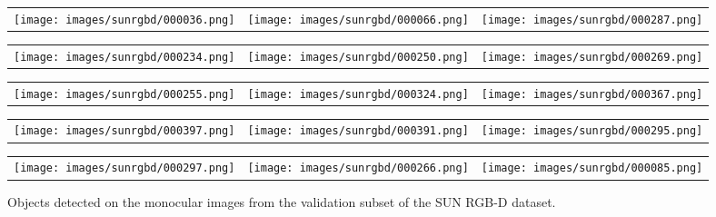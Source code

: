 \documentclass[10pt,twocolumn,letterpaper]{article}
\begin{document}
\begin{figure*}[!ht]
\centering
\setlength{\tabcolsep}{2pt}
\renewcommand{\arraystretch}{0.75}
\begin{tabular}{ccc}
    \texttt{[image: images/sunrgbd/000036.png]} &
    \texttt{[image: images/sunrgbd/000066.png]} &
    \texttt{[image: images/sunrgbd/000287.png]} \\
\end{tabular}
\begin{tabular}{ccc}
    \texttt{[image: images/sunrgbd/000234.png]} &
    \texttt{[image: images/sunrgbd/000250.png]} &
    \texttt{[image: images/sunrgbd/000269.png]} \\
\end{tabular}
\begin{tabular}{ccc}
    \texttt{[image: images/sunrgbd/000255.png]} &
    \texttt{[image: images/sunrgbd/000324.png]} &
    \texttt{[image: images/sunrgbd/000367.png]} \\
\end{tabular}
\begin{tabular}{ccc}
    \texttt{[image: images/sunrgbd/000397.png]} &
    \texttt{[image: images/sunrgbd/000391.png]} &
    \texttt{[image: images/sunrgbd/000295.png]} \\
\end{tabular}
\begin{tabular}{ccc}
    \texttt{[image: images/sunrgbd/000297.png]} &
    \texttt{[image: images/sunrgbd/000266.png]} &
    \texttt{[image: images/sunrgbd/000085.png]} \\
\end{tabular}
\caption{Objects detected on the monocular images from the validation subset of the SUN RGB-D dataset.}
\label{fig:vis_sunrgbd}
\end{figure*}
\end{document}
